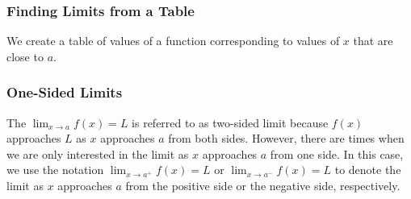 \documentclass{report}
\begin{document}
\subsubsection{Finding Limits from a Table}
We create a table of values of a function corresponding to values of $x$ that are close to $a$.

\subsubsection{One-Sided Limits}
The $\lim_{x \to a}  f(x)=L$ is referred to as two-sided limit because $f(x)$ approaches $L$ as $x$ approaches $a$ from both sides. However, there are times when we are only interested in the limit as $x$ approaches $a$ from one side. In this case, we use the notation $\lim_{x \to a^+}  f(x)=L$ or $\lim_{x \to a^-}  f(x)=L$ to denote the limit as $x$ approaches $a$ from the positive side or the negative side, respectively.
\end{document}
